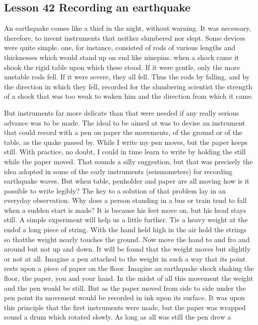 \documentclass[kindlepaper]{BHCexam4kindle}
\begin{document}
\subsection{Lesson 42
Recording an earthquake}
\par
An earthquake comes like a thief in the night, without warning. It was necessary, therefore, to invent
instruments that neither slumbered nor slept. Some devices were quite simple. one, for instance, consisted of
rods of various lengths and thicknesses which would stand up on end like ninepins. when a shock came it
shook the rigid table upon which these stood. If it were gentle, only the more unstable rods fell. If it were
severe, they all fell. Thus the rods by falling, and by the direction in which they fell, recorded for the
slumbering scientist the strength of a shock that was too weak to waken him and the direction from which it
came.
\par
But instruments far more delicate than that were needed if any really serious advance was to be made. The
ideal to be aimed at was to devise an instrument that could record with a pen on paper the movements, of the
ground or of the table, as the quake passed by. While I write my pen moves, but the paper keeps still. With
practice, no doubt, I could in time learn to write by holding the still while the paper moved. That sounds a silly
suggestion, but that was precisely the idea adopted in some of the early instruments (seismometers) for
recording earthquake waves. But when table, penholder and paper are all moving how is it possible to write
legibly? The key to a solution of that problem lay in an everyday observation. Why does a person standing in a
bus or train tend to fall when a sudden start is made? It is because his feet move on, but his head stays still. A
simple experiment will help us a little further. Tie a heavy weight at the endof a long piece of string. With the
hand held high in the air hold the strings so thatthe weight nearly touches the ground. Now move the hand to
and fro and around but not up and down. It will be found that the weight moves but slightly or not at all.
Imagine a pen attached to the weight in such a way that its point rests upon a piece of paper on the floor.
Imagine an earthquake shock shaking the floor, the paper, you and your hand. In the midst of all this movement
the weight and the pen would be still. But as the paper moved from side to side under the pen point its
movement would be recorded in ink upon its surface. It was upon this principle that the first instruments were
made, but the paper was wrapped round a drum which rotated slowly. As long as all was still the pen drew a
\end{document}
